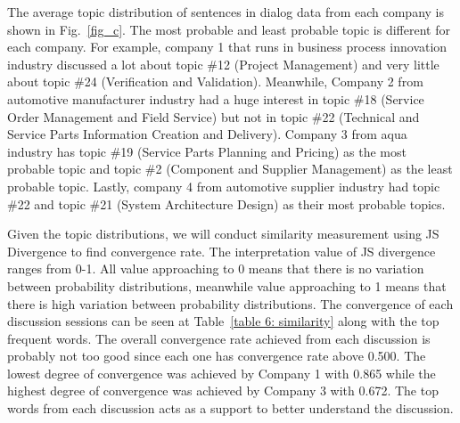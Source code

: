 \documentclass[10pt, conference, compsocconf]{IEEEtran}
\begin{document}
The average topic distribution of sentences in dialog data from each company is shown in Fig.~\ref{fig_c}. The most probable and least probable topic is different for each company. For example, company 1 that runs in business process innovation industry discussed a lot about topic \#12 (Project Management) and very little about topic \#24 (Verification and Validation). Meanwhile, Company 2 from automotive manufacturer industry had a huge interest in topic \#18 (Service Order Management and Field Service) but not in topic \#22 (Technical and Service Parts Information Creation and Delivery). Company 3 from aqua industry has topic \#19 (Service Parts Planning and Pricing) as the most probable topic and topic \#2 (Component and Supplier Management) as the least probable topic. Lastly, company 4 from automotive supplier industry had topic \#22 and topic \#21 (System Architecture Design) as their most probable topics.


%

Given the topic distributions, we will conduct similarity measurement using JS Divergence to find convergence rate. The interpretation value of JS divergence ranges from 0-1. All value approaching to 0 means that there is no variation between probability distributions, meanwhile value approaching to 1 means that there is high variation between probability distributions. The convergence of each discussion sessions can be seen at Table~\ref{table 6: similarity} along with the top frequent words. The overall convergence rate achieved from each discussion is probably not too good since each one has convergence rate above 0.500. The lowest degree of convergence was achieved by Company 1 with 0.865 while the highest degree of convergence was achieved by Company 3 with 0.672.  The top words from each discussion acts as a support to better understand the discussion.
\end{document}
